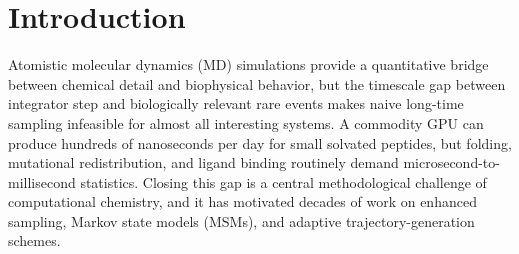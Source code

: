 \documentclass[journal=jctcce,manuscript=article,layout=twocolumn]{achemso}
\begin{document}
\begin{tocentry}
\centering
{}
\end{tocentry}

\section{Introduction}

Atomistic molecular dynamics (MD) simulations provide a quantitative bridge between chemical detail and biophysical behavior, but the timescale gap between integrator step and biologically relevant rare events makes naive long-time sampling infeasible for almost all interesting systems.\cite{lindorff2011how,chodera2014markov}
A commodity GPU can produce hundreds of nanoseconds per day for small solvated peptides, but folding, mutational redistribution, and ligand binding routinely demand microsecond-to-millisecond statistics.
Closing this gap is a central methodological challenge of computational chemistry, and it has motivated decades of work on enhanced sampling, Markov state models (MSMs), and adaptive trajectory-generation schemes.\cite{laio2002escaping,barducci2008well,prinz2011markov,husic2018markov,zuckerman2017weighted,huber1996we}
\end{document}
